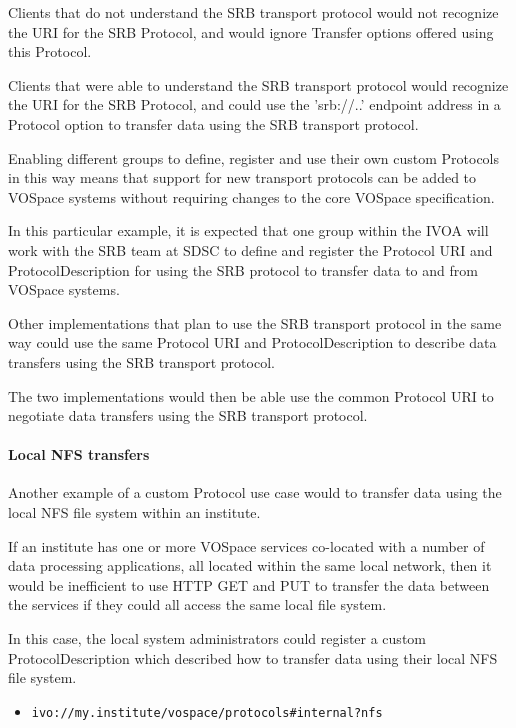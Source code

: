 \documentclass[11pt,a4paper]{ivoa}
\begin{document}
Clients that do not understand the SRB transport protocol would not recognize the URI for the SRB Protocol, and would ignore Transfer options offered using this Protocol.

Clients that were able to understand the SRB transport protocol would recognize the URI for the SRB Protocol, and could use the 'srb://..' endpoint address in a Protocol option to transfer data using the SRB transport protocol.

Enabling different groups to define, register and use their own custom Protocols in this way means that support for new transport protocols can be added to VOSpace systems without requiring changes to the core VOSpace specification.

In this particular example, it is expected that one group within the IVOA will work with the SRB team at SDSC to define and register the Protocol URI and ProtocolDescription for using the SRB protocol to transfer data to and from VOSpace systems.

Other implementations that plan to use the SRB transport protocol in the same way could use the same Protocol URI and ProtocolDescription to describe data transfers using the SRB transport protocol.

The two implementations would then be able use the common Protocol URI to negotiate data transfers using the SRB transport protocol.

\paragraph{Local NFS transfers}
Another example of a custom Protocol use case would to transfer data using the local NFS file system within an institute.

If an institute has one or more VOSpace services co-located with a number of data processing applications, all located within the same local network, then it would be inefficient to use HTTP GET and PUT to transfer the data between the services if they could all access the same local file system.

In this case, the local system administrators could register a custom ProtocolDescription which described how to transfer data using their local NFS file system.

\begin{itemize}
    \item \begin{verbatim}ivo://my.institute/vospace/protocols#internal?nfs\end{verbatim}
\end{itemize}
\end{document}

